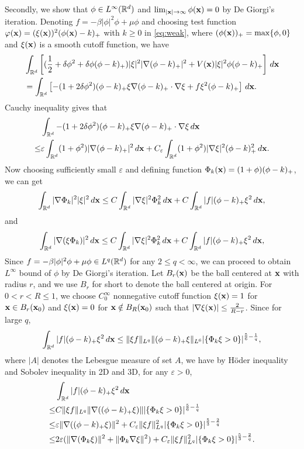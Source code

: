 \documentclass{elsarticle}
\newcommand{\vep}{\varepsilon}
\newcommand{\be}{\begin{equation}}
\newcommand{\ee}{\end{equation}}
\newcommand{\bx}{{\bf x} }
\begin{document}
Secondly, we show that $\phi\in L^\infty(\Bbb R^d)$ and $\lim_{|\bx|\to\infty}\phi(\bx)=0$ by De Giorgi's iteration.
Denoting $f=-\beta|\phi|^2\phi+\mu\phi$ and choosing
test function $\varphi(\bx)=(\xi(\bx))^2(\phi(\bx)-k)_+$ with $k\ge0$ in \eqref{eq:weak}, where $(\phi(\bx))_+=\max\{\phi,0\}$  and $\xi(\bx)$ is
a smooth cutoff function,  we have
\begin{align*}
&\int_{\Bbb R^d} \left[(\frac12+\delta\phi^2+\delta\phi(\phi-k)_+)|\xi|^2|\nabla(\phi-k)_+|^2+ V(\bx)|\xi|^2\phi(\phi-k)_+\right]\,d\bx\\
&=\int_{\Bbb R^d}\left[-(1+2\delta\phi^2)(\phi-k)_+\xi\nabla(\phi-k)_+\cdot\nabla\xi+f\xi^2(\phi-k)_+\right]\,d\bx.
\end{align*}
Cauchy inequality gives that
\begin{align*}
&\int_{\Bbb R^d}-(1+2\delta\phi^2)(\phi-k)_+\xi\nabla(\phi-k)_+\cdot\nabla\xi\,d\bx\\
\leq &\vep\int_{\Bbb R^d}(1+\phi^2)|\nabla(\phi-k)_+|^2\,d\bx
+C_{\vep}\int_{\Bbb R^d}(1+\phi^2)|\nabla\xi|^2(\phi-k)_+^2\,d\bx.
\end{align*}
Now choosing sufficiently small $\vep$ and defining function $\Phi_k(\bx)=(1+\phi)(\phi-k)_+$, we can get
\be
\int_{\Bbb R^d}|\nabla\Phi_k|^2|\xi|^2\,d\bx\leq C\int_{\Bbb R^d}|\nabla\xi|^2\Phi_k^2\,d\bx+C\int_{\Bbb R^d}|f|(\phi-k)_+\xi^2\,d\bx,
\ee
and
\be\label{eq:dgit1}
\int_{\Bbb R^d}|\nabla(\xi\Phi_k)|^2\,d\bx\leq C\int_{\Bbb R^d}|\nabla\xi|^2\Phi_k^2\,d\bx+C\int_{\Bbb R^d}|f|(\phi-k)_+\xi^2\,d\bx,
\ee
Since $f=-\beta|\phi|^2\phi+\mu\phi\in L^q(\Bbb R^d)$ for any $2\leq q<\infty$, we can proceed to obtain $L^\infty$ bound of $\phi$ by De Giorgi's iteration. Let $B_r(\bx)$
be the ball centered at $\bx$ with radius $r$, and we use $B_r$ for short to denote the ball centered at origin.  For $0<r<R\leq 1$, we choose $C_0^\infty$ nonnegative cutoff function $\xi(\bx)=1$ for $\bx\in B_r(\bx_0)$ and $\xi(\bx)=0$ for $\bx\notin B_R(\bx_0)$ such that
$|\nabla\xi(\bx)|\leq \frac{2}{R-r}$. Since for large $q$,
\be
\int_{\Bbb R^d}|f|(\phi-k)_+\xi^2\,d\bx\leq \|\xi f\|_{L^q}\|(\phi-k)_+\xi\|_{L^6}|\{\Phi_k\xi>0\}|^{\frac{5}{6}-\frac{1}{q}},
\ee
where $|A|$ denotes the Lebesgue measure of set $A$, we have by H\"oder inequality and Sobolev inequality in 2D and 3D, for any $\vep>0$,
\begin{align*}
&\int_{\Bbb R^d}|f|(\phi-k)_+\xi^2\,d\bx\\
\leq& C\|\xi f\|_{L^q}\|\nabla((\phi-k)_+\xi)\||\{\Phi_k\xi>0\}|^{\frac{5}{6}-\frac{1}{q}}\\
\leq& \vep \|\nabla((\phi-k)_+\xi)\|^2+C_{\vep}\|\xi f\|_{L^q}^2|\{\Phi_k\xi>0\}|^{\frac{5}{3}-\frac{2}{q}}\\
\leq& 2\vep (\|\nabla(\Phi_k\xi)\|^2+\|\Phi_k\nabla\xi\|^2)+C_{\vep}\|\xi f\|_{L^q}^2|\{\Phi_k\xi>0\}|^{\frac{5}{3}-\frac{2}{q}}.
\end{align*}
\end{document}
